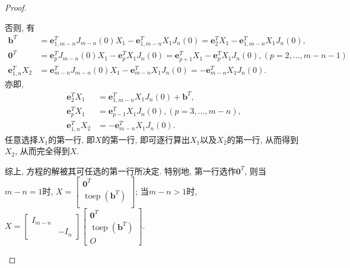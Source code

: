 \documentclass{ctexart}
\newcommand\bs[1]{\boldsymbol{ #1}}
\def\zero{O}
\DeclareMathOperator{\toep}{toep}
\begin{document}
\begin{proof}
\begin{enumerate}
		否则, 有
		\begin{align*}
			\bs b^T&=\bs e_{1,m-n}^TJ_{m-n}(0)X_1-\bs e_{1,m-n}^TX_1J_n(0)=\bs e_{2}^TX_1-\bs e_{1,m-n}^TX_1J_n(0),\\
			\bs 0^T&=\bs e_{p}^TJ_{m-n}(0)X_1-\bs e_{p}^TX_1J_n(0)=\bs e_{p+1}^TX_1-\bs e_{p}^TX_1J_n(0),(p=2,\dots,m-n-1)\\
			\bs e_{1,n}^TX_2&=\bs e_{m-n}^TJ_{m-n}(0)X_1-\bs e_{m-n}^TX_1J_n(0) =-\bs e_{m-n}^TX_1J_n(0).
		\end{align*}
		亦即, 
		\begin{align*}
			\bs e_{2}^TX_1&=\bs e_{1,m-n}^TX_1J_n(0)+\bs b^T,\\
			\bs e_{p}^TX_1&=\bs e_{p-1}^TX_1J_n(0),(p=3,\dots,m-n),\\
			\bs e_{1,n}^TX_2 &=-\bs e_{m-n}^TX_1J_n(0)
		.
		\end{align*}
		任意选择$X_1$的第一行, 即$X$的第一行, 即可逐行算出$X_1$以及$X_2$的第一行, 从而得到$X_2$, 从而完全得到$X$. 

		综上, 方程的解被其可任选的第一行所决定. 
		特别地, 第一行选作$\bs 0^T$, 则当$m-n=1$时, $X=\begin{bmatrix}
			\bs 0^T\\ \toep(\bs b^T)\\ 
		\end{bmatrix}$; 当$m-n>1$时, 
$X=\begin{bmatrix}
			I_{m-n}&\\& -I_n
		\end{bmatrix}\begin{bmatrix}
			\bs 0^T\\ \toep(\bs b^T)\\ \zero
		\end{bmatrix}$. 
			

\end{enumerate}
\end{proof}
\end{document}

